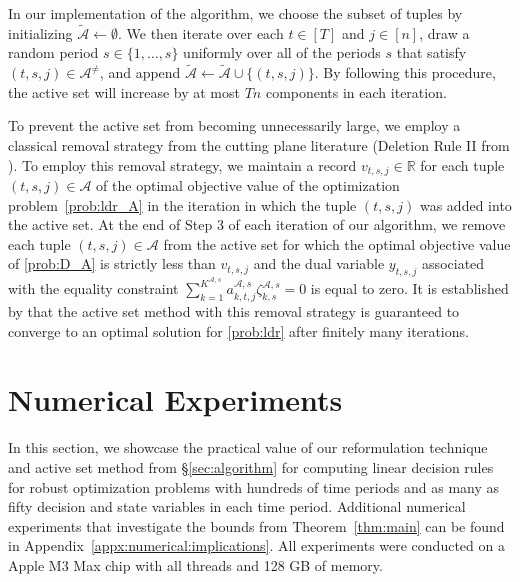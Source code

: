 \documentclass[nonblindrev,mnsc]{informs3} %
\def\Real{\mathbb{R}}
\let\R\Real
\begin{document}
\begin{remark}In our implementation of the algorithm,  we choose the subset of tuples by initializing $\widetilde{\mathcal{A}} \leftarrow \emptyset$. We then iterate over each $t \in [T]$ and $j \in [n]$, draw a random period $s \in \{1,\ldots,s\}$ uniformly over all of the periods $s$ that satisfy $(t,s,j) \in \mathcal{A}^{\neq}$, and append $\widetilde{\mathcal{A}} \leftarrow \widetilde{\mathcal{A}} \cup \{(t,s,j) \}$. By following this procedure, the active set will increase by at most $Tn$ components in each iteration. 
\end{remark}
\begin{remark}
To prevent the active set from becoming unnecessarily  large, we  employ a classical removal strategy from the cutting plane literature (Deletion Rule II  from \cite{elzinga1975central}). To employ this removal strategy, we maintain a record $v_{t,s,j} \in \R$ for each tuple $(t,s,j) \in \mathcal{A}$ of the optimal objective value of the optimization problem~\eqref{prob:ldr_A} in the iteration in which the tuple $(t,s,j)$ was added into the active set. At the end of Step 3 of each iteration of our algorithm, we remove each tuple $(t,s,j) \in \mathcal{A}$ from the active set for which the optimal objective value of \eqref{prob:D_A} is strictly less than $v_{t,s,j}$ and the dual variable $y_{t,s,j}$ associated with the equality constraint  $\sum_{k=1}^{K^{\mathcal{A},s}}  a^{\mathcal{A},s}_{k,t,j}  \zeta^{\mathcal{A},s}_{k,s}   = 0 $ is equal to zero. It is established by \cite{elzinga1975central} that the active set method with this removal strategy is guaranteed to converge to an optimal solution for \eqref{prob:ldr} after finitely many iterations.  

\end{remark}















\section{Numerical Experiments} \label{sec:experiment}

In this section, we showcase the practical value of our  reformulation technique and active set method from \S\ref{sec:algorithm} for computing linear decision rules for robust optimization problems with hundreds of time periods and as many as fifty decision and state variables in each time period. Additional numerical experiments that investigate the bounds from  Theorem~\ref{thm:main} can be found in Appendix~\ref{appx:numerical:implications}. All experiments were conducted on a Apple M3 Max chip with all threads and 128 GB of memory.
 
\end{document}

